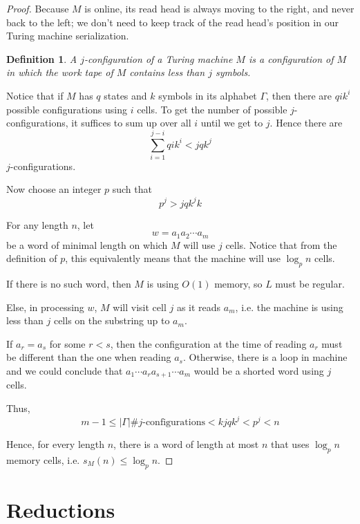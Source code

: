 \documentclass{article}
\newtheorem{definition}{Definition}
\begin{document}
\begin{proof}
    Because $M$ is online, its read head is always moving to the right, and
    never back to the left; we don't need to keep track of the read head's
    position in our Turing machine serialization.

    \begin{definition}
        A \emph{$j$-configuration} of a Turing machine $M$ is a configuration
        of $M$ in which the work tape of $M$ contains less than $j$ symbols.
    \end{definition}

    Notice that if $M$ has $q$ states and $k$ symbols in its alphabet $\Gamma$,
    then there are $q i k^i$ possible configurations using $i$ cells. To get
    the number of possible $j$-configurations, it suffices to sum up over all
    $i$ until we get to $j$. Hence there are
    $$
    \sum_{i = 1}^{j-i} {q i k^i} < j q k^j
    $$
    $j$-configurations.

    Now choose an integer $p$ such that $$ p^j > j q k^j k $$

    For any length $n$, let $$ w = a_1 a_2 \cdots a_m $$ be a word of minimal
    length on which $M$ will use $j$ cells. Notice that from the definition of
    $p$, this equivalently means that the machine will use $\log_p n$ cells.

    If there is no such word, then $M$ is using $O(1)$ memory, so $L$ must be
    regular.

    Else, in processing $w$, $M$ will visit cell $j$ as it reads $a_m$, i.e.
    the machine is using less than $j$ cells on the substring up to $a_m$.

    If $a_r = a_s$ for some $r < s$, then the configuration at the time of
    reading $a_r$ must be different than the one when reading $a_s$. Otherwise,
    there is a loop in machine and we could conclude that $a_1 \cdots a_r
    a_{s+1} \cdots a_m$ would be a shorted word using $j$ cells.

    Thus,
    $$
    m-1 \leq |\Gamma| \#j\text{-configurations} < k j q k^j < p^j < n
    $$

    Hence, for every length $n$, there is a word of length at most $n$ that
    uses $\log_p n$ memory cells, i.e. $s_M(n) \leq \log_p n$.
\end{proof}

\section{Reductions}
\end{document}
